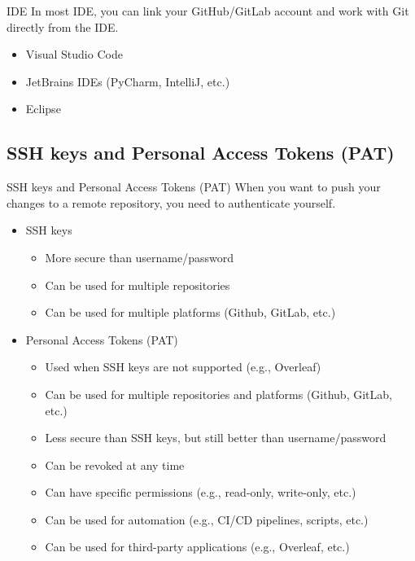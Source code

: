 \documentclass[show notes on second screen=right]{beamer}
\begin{document}
\begin{frame}[t]{IDE}
  In most IDE, you can link your GitHub/GitLab account and work with Git directly from the IDE.\\
  \begin{itemize}
    \item Visual Studio Code
    \item JetBrains IDEs (PyCharm, IntelliJ, etc.)
    \item Eclipse
  \end{itemize}
\end{frame}

\subsection{SSH keys and Personal Access Tokens (PAT)}
\begin{frame}[t]{SSH keys and Personal Access Tokens (PAT)}
  \onslide<+->
  When you want to push your changes to a remote repository, you need to authenticate yourself.\\
  \onslide<+->
  \begin{itemize}
    \item SSH keys
    \begin{itemize}
      \item More secure than username/password
      \item Can be used for multiple repositories
      \item Can be used for multiple platforms (Github, GitLab, etc.)
    \end{itemize}
    \onslide<+->
    \item Personal Access Tokens (PAT)
    \begin{itemize}
      \item Used when SSH keys are not supported (e.g., Overleaf)
      \item Can be used for multiple repositories and platforms (Github, GitLab, etc.)
      \item Less secure than SSH keys, but still better than username/password
      \item Can be revoked at any time
      \item Can have specific permissions (e.g., read-only, write-only, etc.)
      \item Can be used for automation (e.g., CI/CD pipelines, scripts, etc.)
      \item Can be used for third-party applications (e.g., Overleaf, etc.)
    \end{itemize}
  \end{itemize}
\end{frame}
\end{document}
